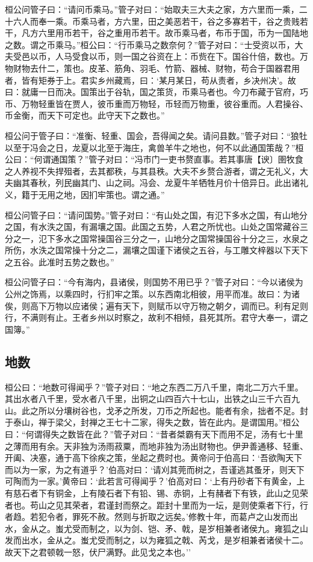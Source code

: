 \documentclass[]{article}
\begin{document}
桓公问管子曰：``请问币乘马。''管子对曰：``始取夫三大夫之家，方六里而一乘，二十六人而奉一乘。币乘马者，方六里，田之美恶若干，谷之多寡若干，谷之贵贱若干，凡方六里用币若干，谷之重用币若干。故币乘马者，布币于国，币为一国陆地之数。谓之币乘马。''桓公曰：``行币乘马之数奈何？''管子对曰：``士受资以币，大夫受邑以币，人马受食以币，则一国之谷资在上：币赀在下。国谷什倍，数也。万物财物去什二，策也。皮革、筋角、羽毛、竹箭、器械、财物，苟合于国器君用者，皆有矩券于上。君实乡州藏焉，曰：`某月某日，苟从责者，乡决州决'。故曰：就庸一日而决。国策出于谷轨，国之策货，币乘马者也。今刀布藏于官府，巧币、万物轻重皆在贾人，彼币重而万物轻，币轻而万物重，彼谷重而。人君操谷、币金衡，而天下可定也。此守天下之数也。''

桓公问于管子曰：``准衡、轻重、国会，吾得闻之矣。请问县数。''管子对曰：``狼牡以至于冯会之日，龙夏以北至于海庄，禽兽羊牛之地也，何不以此通国策哉？''桓公曰：``何谓通国策？''管子对曰：``冯市门一吏书赘直事。若其事唐【谀〕圉牧食之人养视不失捍殂者，去其都秩，与其县秩。大夫不乡赘合游者，谓之无礼义，大夫幽其春秋，列民幽其门、山之祠。冯会、龙夏牛羊牺牲月价十倍异日。此出诸礼义，籍于无用之地，因扪牢策也。谓之通。''

桓公问管子曰：``请问国势。''管子对曰：``有山处之国，有氾下多水之国，有山地分之国，有水泆之国，有漏壤之国。此国之五势，人君之所忧也。山处之国常藏谷三分之一，氾下多水之国常操国谷三分之一，山地分之国常操国谷十分之三，水泉之所伤，水泆之国常操十分之二，漏壤之国谨下诸侯之五谷，与工雕文梓器以下天下之五谷。此准时五势之数也。''

桓公问管子曰：``今有海内，县诸侯，则国势不用已乎？''管子对曰：``今以诸侯为公州之饰焉，以乘四时，行扪牢之策。以东西南北相彼，用平而准。故曰：为诸俟，则高下万物以应诸侯；遍有天下，则赋币以守万物之朝夕，调而已。利有足则行，不满则有止。王者乡州以时察之，故利不相倾，县死其所。君守大奉一，谓之国簿。''

\hypertarget{header-n1021}{%
\subsection{地数}\label{header-n1021}}

桓公曰：``地数可得闻乎？''管子对曰：``地之东西二万八千里，南北二万六千里。其出水者八千里，受水者八千里，出铜之山四百六十七山，出铁之山三千六百九山。此之所以分壤树谷也，戈矛之所发，刀币之所起也。能者有余，拙者不足。封于泰山，禅于梁父，封禅之王七十二家，得失之数，皆在此内。是谓国用。''桓公曰：``何谓得失之数皆在此？''管子对曰：``昔者桀霸有天下而用不足，汤有七十里之薄而用有余。天非独为汤雨菽粟，而地非独为汤出财物也。伊尹善通移、轻重、开阖、决塞，通于高下徐疾之策，坐起之费时也。黄帝问于伯高曰：`吾欲陶天下而以为一家，为之有道乎？'伯高对曰：`请刈其莞而树之，吾谨逃其蚤牙，则天下可陶而为一家。'黄帝曰：`此若言可得闻乎？'伯高对曰：`上有丹砂者下有黄金，上有慈石者下有铜金，上有陵石者下有铅、锡、赤铜，上有赭者下有铁，此山之见荣者也。苟山之见其荣者，君谨封而祭之。距封十里而为一坛，是则使乘者下行，行者趋。若犯令者，罪死不赦。然则与折取之远矣。'修教十年，而葛卢之山发而出水，金从之。蚩尤受而制之，以为剑、铠、矛、戟，是岁相兼者诸侯九。雍狐之山发而出水，金从之。蚩尤受而制之，以为雍狐之戟、芮戈，是岁相兼者诸侯十二。故天下之君顿戟一怒，伏尸满野。此见戈之本也。''
\end{document}
